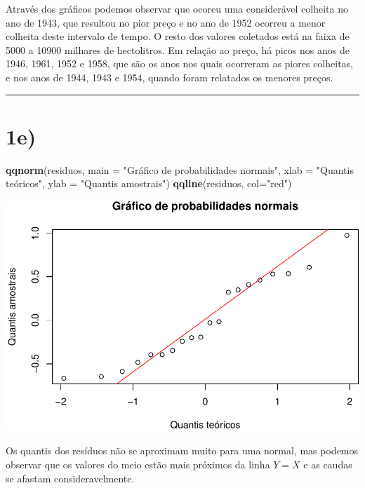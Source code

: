 \documentclass[11pt,]{article}
\makeatletter
\newenvironment{Shaded}{\begin{snugshade}}{\end{snugshade}}
\newcommand{\KeywordTok}[1]{\textcolor[rgb]{0.13,0.29,0.53}{\textbf{{#1}}}}
\newcommand{\DataTypeTok}[1]{\textcolor[rgb]{0.13,0.29,0.53}{{#1}}}
\newcommand{\StringTok}[1]{\textcolor[rgb]{0.31,0.60,0.02}{{#1}}}
\newcommand{\NormalTok}[1]{{#1}}
\def\maxwidth{\ifdim\Gin@nat@width>\linewidth\linewidth
\else\Gin@nat@width\fi}
\let\Oldincludegraphics\includegraphics
\renewcommand{\includegraphics}[1]{\Oldincludegraphics[width=\maxwidth]{#1}}
\makeatother
\begin{document}
Através dos gráficos podemos observar que ocoreu uma considerável
colheita no ano de 1943, que resultou no pior preço e no ano de 1952
ocorreu a menor colheita deste intervalo de tempo. O resto dos valores
coletados está na faixa de 5000 a 10900 milhares de hectolitros. Em
relação ao preço, há picos nos anos de 1946, 1961, 1952 e 1958, que são
os anos nos quais ocorreram as piores colheitas, e nos anos de 1944,
1943 e 1954, quando foram relatados os menores preços.

\begin{center}\rule{0.5\linewidth}{\linethickness}\end{center}

\section{1e)}\label{e}

\begin{Shaded}
\begin{Highlighting}[]
\KeywordTok{qqnorm}\NormalTok{(residuos, }
       \DataTypeTok{main =} \StringTok{"Gráfico de probabilidades normais"}\NormalTok{, }
       \DataTypeTok{xlab =} \StringTok{"Quantis teóricos"}\NormalTok{, }
       \DataTypeTok{ylab =} \StringTok{"Quantis amostrais"}\NormalTok{)}
\KeywordTok{qqline}\NormalTok{(residuos, }\DataTypeTok{col=}\StringTok{"red"}\NormalTok{)}
\end{Highlighting}
\end{Shaded}

\includegraphics{versaofinal_lista3_files/figure-latex/unnamed-chunk-6-1.pdf}

Os quantis dos resíduos não se aproximam muito para uma normal, mas
podemos observar que os valores do meio estão mais próximos da linha
\(Y=X\) e as caudas se afastam consideravelmente.
\end{document}
